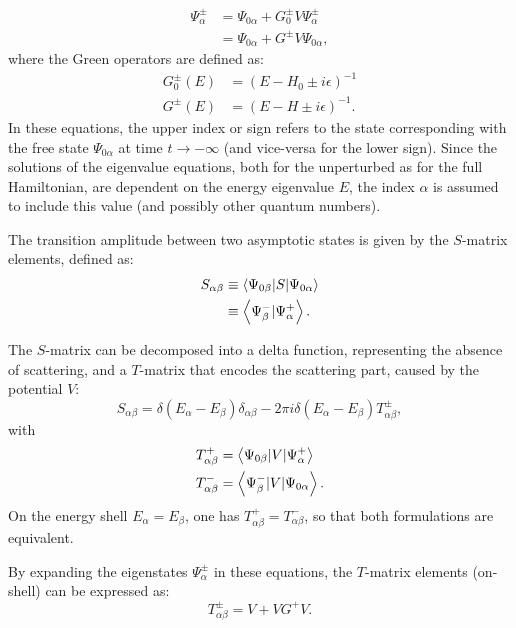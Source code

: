 \begin{align*}
  \Psi^\pm_\alpha &= \Psi_{0\alpha} + G^\pm_0 V \Psi^\pm_\alpha  \\
  & = \Psi_{0\alpha} + G^\pm V  \Psi_{0\alpha},
\end{align*}
where the Green operators are defined as:
\begin{align*}
  G^\pm_0(E) &= (E-H_0\pm i\epsilon )^{-1}  \\
  G^\pm (E) &= (E-H\pm i\epsilon )^{-1}.
\end{align*}
In these equations, the upper index or sign refers to the state corresponding with the free state $\Psi_{0\alpha}$ at time $t\rightarrow - \infty$ (and vice-versa for the lower sign). Since the solutions of the eigenvalue equations, both for the unperturbed as for the full Hamiltonian, are dependent on the energy eigenvalue $E$, the index $\alpha$ is assumed to include this value (and possibly other quantum numbers).

The transition amplitude between two asymptotic states is given by the $S$-matrix elements, defined as:
\begin{align}
  S_{\alpha\beta} &\equiv \left\langle \Psi_{0\beta} \vert S \vert \Psi_{0\alpha} \right\rangle \nonumber\\
  & \equiv \left\langle \Psi_\beta^- \vert \Psi_\alpha^+ \right\rangle.
  \label{<++>}
\end{align}

The $S$-matrix can be decomposed into a delta function, representing the absence of scattering, and a $T$-matrix that encodes the scattering part, caused by the potential $V$:
\begin{equation*}
  S_{\alpha\beta} = \delta (E_\alpha - E_\beta)\delta_{\alpha\beta} - 2\pi i \delta (E_\alpha - E_\beta) T^\pm_{\alpha\beta},
\end{equation*}
with
\begin{align*}
  T^+_{\alpha\beta} & = \left\langle \Psi_{0\beta} \vert V \vert \Psi^+_\alpha \right\rangle \\
  T^-_{\alpha\beta} & = \left\langle \Psi^-_\beta \vert V \vert \Psi_{0\alpha} \right\rangle.
\end{align*}
On the energy shell $E_\alpha = E_\beta$, one has $T^+_{\alpha\beta}= T^-_{\alpha\beta}$, so that both formulations are equivalent.

By expanding the eigenstates $\Psi^\pm_\alpha$ in these equations, the $T$-matrix elements (on-shell) can be expressed as:
\begin{equation*}
  T^\pm_{\alpha\beta} = V + VG^+ V.
\end{equation*}


